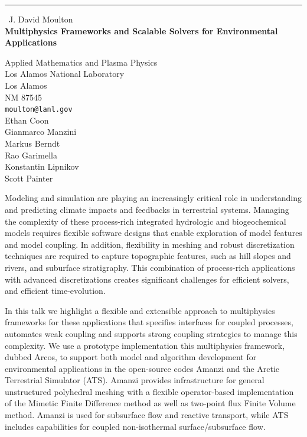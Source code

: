 \documentclass{report}
\begin{document}
\begin{center}
\rule{6in}{1pt} \
{\large J. David Moulton \\
{\bf Multiphysics Frameworks and Scalable Solvers for Environmental Applications}}

Applied Mathematics and Plasma Physics \\ Los Alamos National Laboratory \\ Los Alamos \\ NM 87545
\\
{\tt moulton@lanl.gov}\\
Ethan Coon\\
Gianmarco Manzini\\
Markus Berndt\\
Rao Garimella\\
Konstantin Lipnikov\\
Scott Painter\end{center}

Modeling and simulation are playing an increasingly critical role in
understanding and predicting climate impacts and feedbacks in terrestrial
systems. Managing the complexity of these process-rich integrated
hydrologic and biogeochemical models requires flexible software designs
that enable exploration of model features and model coupling. In
addition, flexibility in meshing and robust discretization techniques are
required to capture topographic features, such as hill slopes and rivers,
and suburface stratigraphy. This combination of process-rich applications
with advanced discretizations creates significant challenges for
efficient solvers, and efficient time-evolution.

In this talk we highlight a flexible and extensible approach to
multiphysics frameworks for these applications that specifies interfaces
for coupled processes, automates weak coupling and supports strong
coupling strategies to manage this complexity. We use a prototype
implementation this multiphysics framework, dubbed Arcos, to support both
model and algorithm development for environmental applications in the
open-source codes Amanzi and the Arctic Terrestrial Simulator (ATS).
Amanzi provides infrastructure for general unstructured polyhedral
meshing with a flexible operator-based implementation of the Mimetic
Finite Difference method as well as two-point flux Finite Volume method.
Amanzi is used for subsurface flow and reactive transport, while ATS
includes capabilities for coupled non-isothermal surface/subsurface flow.
\end{document}

